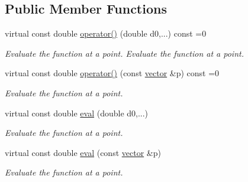 \subsection*{Public Member Functions}
\begin{DoxyCompactItemize}
\item 
\mbox{\label{classsisl_1_1function_afeac9ff55daf5e514e07ce93e2159c67}} 
virtual const double \hyperlink{classsisl_1_1function_afeac9ff55daf5e514e07ce93e2159c67}{operator()} (double d0,...) const =0
\begin{DoxyCompactList}\small\item\em Evaluate the function at a point. Evaluate the function at a point. \end{DoxyCompactList}\item 
\mbox{\label{classsisl_1_1function_ab7cd4c0f5cc11e5c45a087338faf659f}} 
virtual const double \hyperlink{classsisl_1_1function_ab7cd4c0f5cc11e5c45a087338faf659f}{operator()} (const \hyperlink{namespacesisl_a2069bd5374a9be042ff3ce3306d41e1a}{vector} \&p) const =0
\begin{DoxyCompactList}\small\item\em Evaluate the function at a point. \end{DoxyCompactList}\item 
\mbox{\label{classsisl_1_1function_a895e783c03f56af75f0b722822b20d4b}} 
virtual const double \hyperlink{classsisl_1_1function_a895e783c03f56af75f0b722822b20d4b}{eval} (double d0,...)
\begin{DoxyCompactList}\small\item\em Evaluate the function at a point. \end{DoxyCompactList}\item 
\mbox{\label{classsisl_1_1function_ae2644d84c32f0b9e8a167735e26bca88}} 
virtual const double \hyperlink{classsisl_1_1function_ae2644d84c32f0b9e8a167735e26bca88}{eval} (const \hyperlink{namespacesisl_a2069bd5374a9be042ff3ce3306d41e1a}{vector} \&p)
\begin{DoxyCompactList}\small\item\em Evaluate the function at a point. \end{DoxyCompactList}\item 
\mbox{\label{classsisl_1_1function_a520bfaebbd09c1d8678a129c548d4b1a}} 

\end{DoxyCompactItemize}
